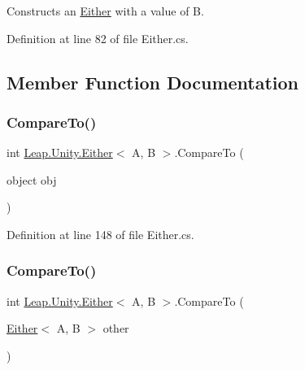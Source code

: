 Constructs an \mbox{\hyperlink{struct_leap_1_1_unity_1_1_either}{Either}} with a value of B. 



Definition at line 82 of file Either.\+cs.



\subsection{Member Function Documentation}
\mbox{\label{struct_leap_1_1_unity_1_1_either_a1b677bf5b50b5b6e794821f17b201825}} 
\subsubsection{\texorpdfstring{CompareTo()}{CompareTo()}\hspace{0.1cm}{\footnotesize\ttfamily [1/2]}}
{\footnotesize\ttfamily int \mbox{\hyperlink{struct_leap_1_1_unity_1_1_either}{Leap.\+Unity.\+Either}}$<$ A, B $>$.Compare\+To (\begin{DoxyParamCaption}\item[{object}]{obj }\end{DoxyParamCaption})}



Definition at line 148 of file Either.\+cs.

\mbox{\label{struct_leap_1_1_unity_1_1_either_a91e207fc83d8fa9442a9dcfffcdbe2d4}} 
\subsubsection{\texorpdfstring{CompareTo()}{CompareTo()}\hspace{0.1cm}{\footnotesize\ttfamily [2/2]}}
{\footnotesize\ttfamily int \mbox{\hyperlink{struct_leap_1_1_unity_1_1_either}{Leap.\+Unity.\+Either}}$<$ A, B $>$.Compare\+To (\begin{DoxyParamCaption}\item[{\mbox{\hyperlink{struct_leap_1_1_unity_1_1_either}{Either}}$<$ A, B $>$}]{other }\end{DoxyParamCaption})}



